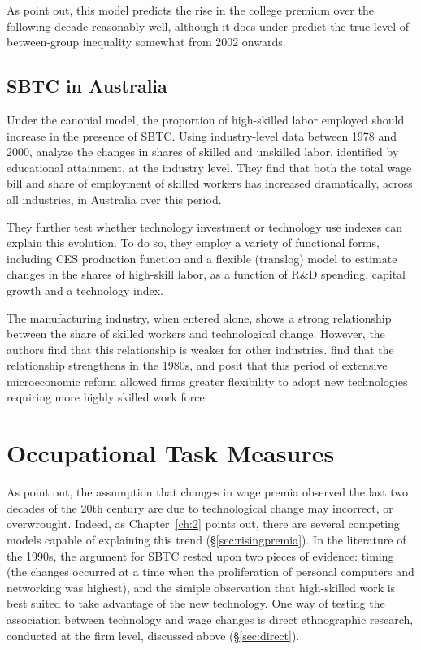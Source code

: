 As \citet{Acemoglu2011} point out, this model predicts the rise in the college premium over the following decade reasonably well, although it does under-predict the true level of between-group inequality somewhat from 2002 onwards.

\subsection{SBTC in Australia}

Under the canonial model, the proportion of high-skilled labor employed should increase in the presence of SBTC. Using industry-level data between 1978 and 2000, \citet{DeLaine2001} analyze the changes in shares of skilled and unskilled labor, identified by educational attainment, at the industry level. They find that both the total wage bill and share of employment of skilled workers has increased dramatically, across all industries, in Australia over this period.

They further test whether technology investment or technology use indexes can explain this evolution. To do so, they employ a variety of functional forms, including CES production function and a flexible (translog) model to estimate changes in the shares of high-skill labor, as a function of R\&D spending, capital growth and a technology index. 

The manufacturing industry, when entered alone, shows a strong relationship between the share of skilled workers and technological change. However, the authors find that this relationship is weaker for other industries. \citet{DeLaine2001} find that the relationship strengthens in the 1980s, and posit that this period of extensive microeconomic reform allowed firms greater flexibility to adopt new technologies requiring more highly skilled work force.


\section{Occupational Task Measures}

As \citet{DiNardo1997} point out, the assumption that changes in wage premia observed the last two decades of the 20th century are due to technological change may incorrect, or overwrought. Indeed, as Chapter~\ref{ch:2} points out, there are several competing models capable of explaining this trend (\S\ref{sec:risingpremia}). In the literature of the 1990s, the argument for SBTC rested upon two pieces of evidence: timing (the changes occurred at a time when the proliferation of personal computers and networking was highest), and the simiple observation that high-skilled work is best suited to take advantage of the new technology. One way of testing the association between technology and wage changes is direct ethnographic research, conducted at the firm level, discussed above (\S\ref{sec:direct}).

